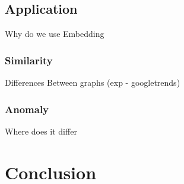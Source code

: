 \documentclass[sigconf]{acmart}
\begin{document}
\subsection{Application}
Why do we use Embedding
\subsubsection{Similarity}
Differences Between graphs (exp - googletrends)
\subsubsection{Anomaly}
Where does it differ

\section{Conclusion}


\end{document}
